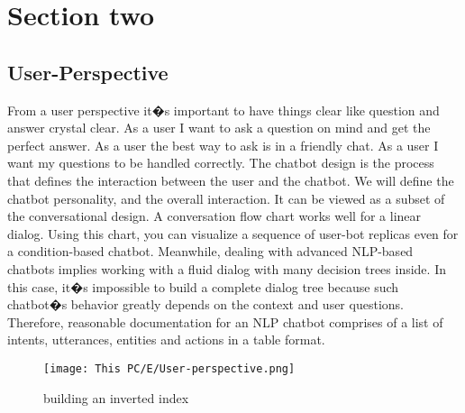 \section{Section two}

  \subsection{User-Perspective}
From a user perspective it�s important to have things clear like question and answer crystal clear. 
As a user I want to ask a question on mind and get the perfect answer.
As a user the best way to ask is in a friendly chat.
As a user I want my questions to be handled correctly.
The chatbot design is the process that defines the interaction between the user and the chatbot. We will define the chatbot personality, and the overall interaction. It can be viewed as a subset of the conversational design. 
A conversation flow chart works well for a linear dialog. Using this chart, you can visualize a sequence of user-bot replicas even for a condition-based chatbot.
Meanwhile, dealing with advanced NLP-based chatbots implies working with a fluid dialog with many decision trees inside. In this case, it�s impossible to build a complete dialog tree because such chatbot�s behavior greatly depends on the context and user questions. Therefore, reasonable documentation for an NLP chatbot comprises of a list of intents, utterances, entities and actions in a table format.

\begin{figure}[H]%
    \center%
    \texttt{[image: This PC/E/User-perspective.png]}
     
    \caption[So in this, the user asks the question �How many of Warsaw�s inhabitants spoke polish in 1933?� 
The question is sent through the messenger bot to the server, then the document retriever retrieves the document that contains the answer from the context, then the answer �833,500� is read back to the user through the server.
]{building an inverted index}\label{fig:User Perspective}%
 \end{figure}
